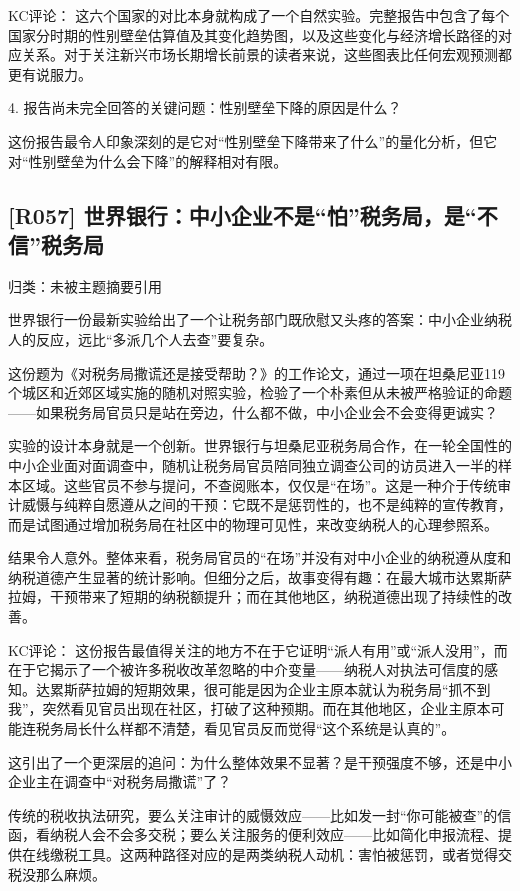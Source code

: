 \documentclass[11pt]{ctexart}
\begin{document}
KC评论： 这六个国家的对比本身就构成了一个自然实验。完整报告中包含了每个国家分时期的性别壁垒估算值及其变化趋势图，以及这些变化与经济增长路径的对应关系。对于关注新兴市场长期增长前景的读者来说，这些图表比任何宏观预测都更有说服力。

4. 报告尚未完全回答的关键问题：性别壁垒下降的原因是什么？

这份报告最令人印象深刻的是它对“性别壁垒下降带来了什么”的量化分析，但它对“性别壁垒为什么会下降”的解释相对有限。

\subsection{[R057] 世界银行：中小企业不是“怕”税务局，是“不信”税务局}
{\small\color{refgray}归类：未被主题摘要引用}

世界银行一份最新实验给出了一个让税务部门既欣慰又头疼的答案：中小企业纳税人的反应，远比“多派几个人去查”要复杂。

这份题为《对税务局撒谎还是接受帮助？》的工作论文，通过一项在坦桑尼亚119个城区和近郊区域实施的随机对照实验，检验了一个朴素但从未被严格验证的命题——如果税务局官员只是站在旁边，什么都不做，中小企业会不会变得更诚实？

实验的设计本身就是一个创新。世界银行与坦桑尼亚税务局合作，在一轮全国性的中小企业面对面调查中，随机让税务局官员陪同独立调查公司的访员进入一半的样本区域。这些官员不参与提问，不查阅账本，仅仅是“在场”。这是一种介于传统审计威慑与纯粹自愿遵从之间的干预：它既不是惩罚性的，也不是纯粹的宣传教育，而是试图通过增加税务局在社区中的物理可见性，来改变纳税人的心理参照系。

结果令人意外。整体来看，税务局官员的“在场”并没有对中小企业的纳税遵从度和纳税道德产生显著的统计影响。但细分之后，故事变得有趣：在最大城市达累斯萨拉姆，干预带来了短期的纳税额提升；而在其他地区，纳税道德出现了持续性的改善。

KC评论： 这份报告最值得关注的地方不在于它证明“派人有用”或“派人没用”，而在于它揭示了一个被许多税收改革忽略的中介变量——纳税人对执法可信度的感知。达累斯萨拉姆的短期效果，很可能是因为企业主原本就认为税务局“抓不到我”，突然看见官员出现在社区，打破了这种预期。而在其他地区，企业主原本可能连税务局长什么样都不清楚，看见官员反而觉得“这个系统是认真的”。

这引出了一个更深层的追问：为什么整体效果不显著？是干预强度不够，还是中小企业主在调查中“对税务局撒谎”了？

传统的税收执法研究，要么关注审计的威慑效应——比如发一封“你可能被查”的信函，看纳税人会不会多交税；要么关注服务的便利效应——比如简化申报流程、提供在线缴税工具。这两种路径对应的是两类纳税人动机：害怕被惩罚，或者觉得交税没那么麻烦。
\end{document}
